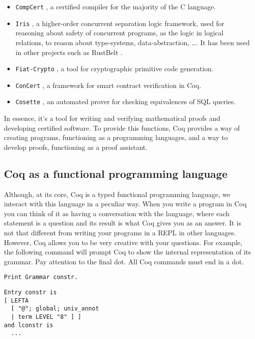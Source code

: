 \begin{itemize}
    \item \verb|CompCert| \cite{CompCert}, 
    a certified compiler for the majority of the C language.
    
    \item \verb|Iris| \cite{Iris}, 
    a higher-order concurrent separation logic framework, used for reasoning about safety of concurrent programs, as the logic in logical relations, to reason about type-systems, data-abstraction, \dots. It has been used in other projects such as RustBelt \cite{RustBelt}.
    
    \item \verb|Fiat-Crypto| \cite{FiatCryptoSP19}, 
    a tool for cryptographic primitive code generation.
    
    \item \verb|ConCert| \cite{ConCert}, 
    a framework for smart contract verification in Coq.
    
    \item \verb|Cosette| \cite{Cosette}, 
    an automated prover for checking equivalences of SQL queries.
\end{itemize}

In essence, it's a tool for writing and verifying mathematical proofs and developing certified software.
To provide this functions, Coq provides a way of creating programs, functioning as a programming 
languages, and a way to develop proofs, functioning as a proof assistant.


\subsection{Coq as a functional programming language}
\label{sect:coq-programming-language}

Although, at its core, Coq is a typed functional programming language, we interact with this language
in a peculiar way. When you write a program in Coq you can think of it as having a conversation with the
language, where each statement is a question and its result is what Coq gives you as an answer. It is not
that different from writing your programs in a REPL in other languages. However, Coq  allows you to be
very creative with your questions. For example, the following command will prompt Coq to show the internal
representation of its grammar. Pay attention to the final dot. All Coq commands must end in a dot.

\begin{verbatim}
Print Grammar constr.
\end{verbatim}
\vspace{-\baselineskip*3/2}
\begin{verbatim}
Entry constr is
[ LEFTA
  [ "@"; global; univ_annot
  | term LEVEL "8" ] ]
and lconstr is
  ...
\end{verbatim}


